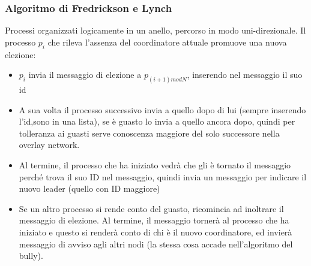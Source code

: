 \documentclass{article}
\begin{document}
\subsubsection{Algoritmo di Fredrickson e Lynch}
Processi organizzati logicamente in un anello, percorso in modo uni-direzionale. Il processo $p_i$ che rileva l'assenza del coordinatore attuale promuove una nuova elezione:
\begin{itemize}
\item $p_i$ invia il messaggio di elezione a $p_{(i+1)modN}$, inserendo nel messaggio il suo id
\item A sua volta il processo successivo invia a quello dopo di lui (sempre inserendo l'id,sono in una lista), se è guasto lo invia a quello ancora dopo, quindi per tolleranza ai guasti serve conoscenza maggiore del solo successore nella overlay network.
\item Al termine, il processo che ha iniziato vedrà che gli è tornato il messaggio perché trova il suo ID nel messaggio, quindi invia un messaggio per indicare il nuovo leader (quello con ID maggiore)
\item Se un altro processo si rende conto del guasto, ricomincia ad inoltrare il messaggio di elezione. Al termine, il messaggio tornerà al processo che ha iniziato e questo si renderà conto di chi è il nuovo coordinatore, ed invierà messaggio di avviso agli altri nodi (la stessa cosa accade nell'algoritmo del bully).
\end{itemize}
\end{document}
